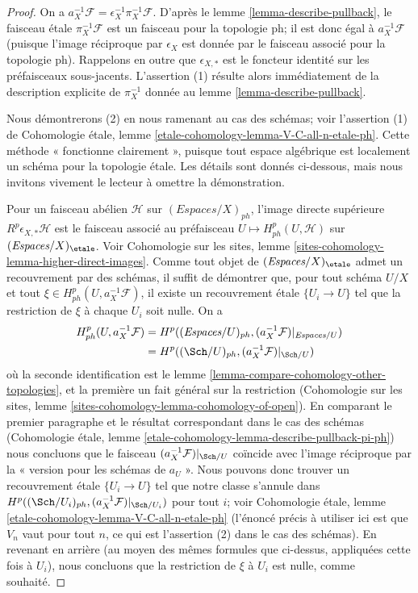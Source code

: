 \begin{proof}
On a $a_X^{-1}\mathcal{F} = \epsilon_X^{-1} \pi_X^{-1}\mathcal{F}$.
D'après le lemme \ref{lemma-describe-pullback}, le faisceau étale
$\pi_X^{-1}\mathcal{F}$ est un faisceau pour la topologie ph; il est donc égal
à $a_X^{-1}\mathcal{F}$ (puisque l'image réciproque par $\epsilon_X$ est donnée
par le faisceau associé pour la topologie ph). Rappelons en outre que
$\epsilon_{X, *}$ est le foncteur identité sur les préfaisceaux sous-jacents.
L'assertion (1) résulte alors immédiatement de la description explicite de
$\pi_X^{-1}$ donnée au lemme \ref{lemma-describe-pullback}.

\medskip\noindent
Nous démontrerons (2) en nous ramenant au cas des schémas; voir l'assertion (1)
de Cohomologie étale, lemme
\ref{etale-cohomology-lemma-V-C-all-n-etale-ph}.
Cette méthode « fonctionne clairement », puisque tout espace algébrique est
localement un schéma pour la topologie étale. Les détails sont donnés ci-dessous,
mais nous invitons vivement le lecteur à omettre la démonstration.

\medskip\noindent
Pour un faisceau abélien $\mathcal{H}$ sur $(\textit{Espaces}/X)_{ph}$,
l'image directe supérieure $R^p\epsilon_{X, *}\mathcal{H}$ est le faisceau
associé au préfaisceau $U \mapsto H^p_{ph}(U, \mathcal{H})$
sur $(\textit{Espaces}/X)_\etale$. Voir Cohomologie sur les sites, lemme
\ref{sites-cohomology-lemma-higher-direct-images}.
Comme tout objet de $(\textit{Espaces}/X)_\etale$ admet un recouvrement par des
schémas, il suffit de démontrer que, pour tout schéma $U/X$ et tout
$\xi \in H^p_{ph}(U, a_X^{-1}\mathcal{F})$, il existe un recouvrement étale
$\{U_i \to U\}$ tel que la restriction de $\xi$ à chaque $U_i$ soit nulle.
On a
\begin{align*}
H^p_{ph}(U, a_X^{-1}\mathcal{F})
& =
H^p((\textit{Espaces}/U)_{ph}, (a_X^{-1}\mathcal{F})|_{\textit{Espaces}/U}) \\
& =
H^p((\Sch/U)_{ph}, (a_X^{-1}\mathcal{F})|_{\Sch/U})
\end{align*}
où la seconde identification est le lemme
\ref{lemma-compare-cohomology-other-topologies}, et la première un fait général
sur la restriction (Cohomologie sur les sites, lemme
\ref{sites-cohomology-lemma-cohomology-of-open}).
En comparant le premier paragraphe et le résultat correspondant dans le cas
des schémas (Cohomologie étale, lemme
\ref{etale-cohomology-lemma-describe-pullback-pi-ph})
nous concluons que le faisceau $(a_X^{-1}\mathcal{F})|_{\Sch/U}$
coïncide avec l'image réciproque par la « version pour les schémas de $a_U$ ».
Nous pouvons donc trouver un recouvrement étale $\{U_i \to U\}$ tel que notre
classe s'annule dans
$H^p((\Sch/U_i)_{ph}, (a_X^{-1}\mathcal{F})|_{\Sch/U_i})$
pour tout $i$; voir Cohomologie étale, lemme
\ref{etale-cohomology-lemma-V-C-all-n-etale-ph}
(l'énoncé précis à utiliser ici est que $V_n$ vaut pour tout $n$, ce qui est
l'assertion (2) dans le cas des schémas).
En revenant en arrière (au moyen des mêmes formules que ci-dessus, appliquées
cette fois à $U_i$), nous concluons que la restriction de $\xi$ à $U_i$
est nulle, comme souhaité.
\end{proof}

